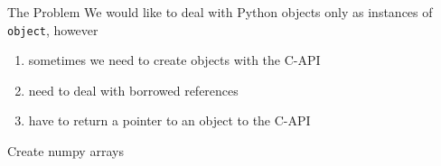 
\begin{frame}[fragile]{The Problem}
    We would like to deal with Python objects only as instances of
    \texttt{object}, however
    \vspace{0.1\textheight}
    \begin{enumerate}
        \setlength{\itemsep}{0.05\textheight}
        \item sometimes we need to create objects with the C-API
        \item need to deal with borrowed references
        \item have to return a pointer to an object to the C-API
    \end{enumerate}
\end{frame}

\begin{frame}[fragile]{Create numpy arrays}
    \inputminted[fontsize=\tiny,firstline=53,lastline=72]{cpp}{../src/python-talk/src/array.cpp}
\end{frame}

